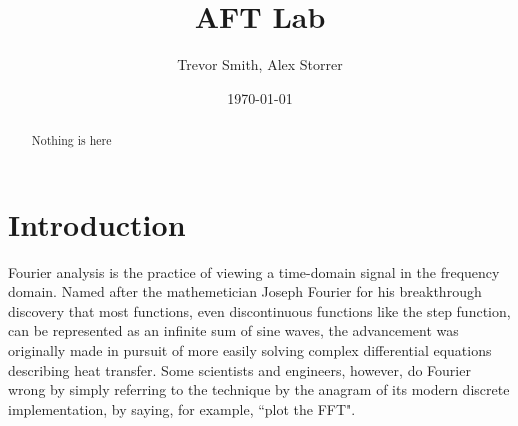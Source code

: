 \documentclass[aps,prl,reprint]{revtex4-2}
\begin{document}

\title{AFT Lab}


\author{Trevor Smith, Alex Storrer}


\date{\today}

\begin{abstract}
	Nothing is here
\end{abstract}


\maketitle

\section{Introduction}
Fourier analysis is the practice of viewing a time-domain signal in the
frequency domain. Named after the mathemetician Joseph Fourier for his 
breakthrough discovery that most functions, even discontinuous functions
like the step function, can be represented as an infinite sum of sine 
waves, the advancement was originally made in pursuit of more easily
solving complex differential equations describing heat transfer. Some 
scientists and engineers, however, do Fourier wrong by simply
referring to the technique by the anagram of its modern discrete 
implementation, by saying, for example, ``plot the FFT". \\
\end{document}
